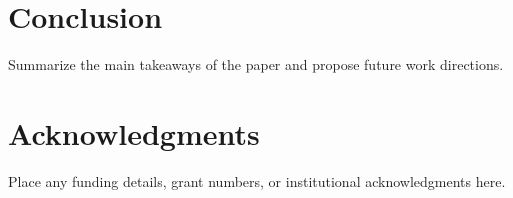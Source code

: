 \documentclass[11pt, letterpaper]{article}
\begin{document}
\section{Conclusion}
Summarize the main takeaways of the paper and propose future work directions.

\section*{Acknowledgments}
Place any funding details, grant numbers, or institutional acknowledgments here.



\end{document}
